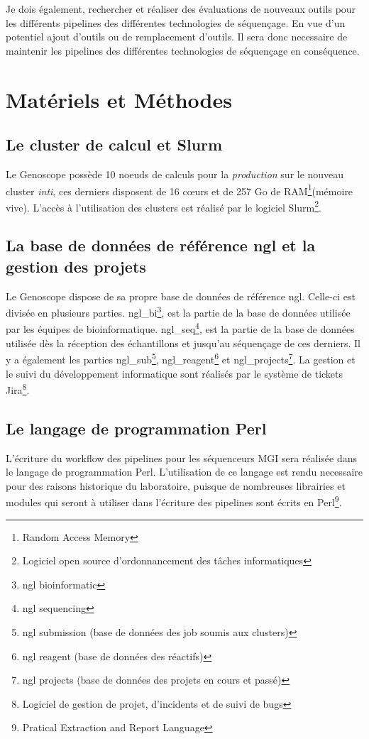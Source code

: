 Je dois également, rechercher et réaliser des évaluations de nouveaux outils pour les différents pipelines des différentes technologies de séquençage. En vue d'un potentiel ajout d'outils ou de remplacement d'outils. Il sera donc necessaire de maintenir les pipelines des différentes technologies de séquençage en conséquence.


\section{Matériels et Méthodes}
\subsection{Le cluster de calcul et Slurm}
Le Genoscope possède 10 noeuds de calculs pour la \emph{production} sur le nouveau cluster \emph{inti}, ces derniers disposent de 16 cœurs et de 257 Go de RAM\footnote{Random Access Memory}(mémoire vive). L'accès à l'utilisation des clusters est réalisé par le logiciel Slurm\footnote{Logiciel open source d'ordonnancement des tâches informatiques}.

\subsection{La base de données de référence ngl et la gestion des projets}
Le Genoscope dispose de sa propre base de données de référence ngl. Celle-ci est divisée en plusieurs parties. ngl\_bi\footnote{ngl bioinformatic}, est la partie de la base de données utilisée par les équipes de bioinformatique. ngl\_seq\footnote{ngl sequencing}, est la partie de la base de données utilisée dès la réception des échantillons et jusqu'au séquençage de ces derniers. Il y a également les parties ngl\_sub\footnote{ngl submission (base de données des job soumis aux clusters)}, ngl\_reagent\footnote{ngl reagent (base de données des réactifs)} et ngl\_projects\footnote{ngl projects (base de données des projets en cours et passé)}. La gestion et le suivi du développement informatique sont réalisés par le système de tickets Jira\footnote{Logiciel de gestion de projet, d'incidents et de suivi de bugs}.

\subsection{Le langage de programmation Perl}
L'écriture du workflow des pipelines pour les séquenceurs MGI sera réalisée dans le langage de programmation Perl. L'utilisation de ce langage est rendu necessaire pour des raisons historique du laboratoire, puisque de nombreuses librairies et modules qui seront à utiliser dans l'écriture des pipelines sont écrits en Perl\footnote{Pratical Extraction and Report Language}.\\

